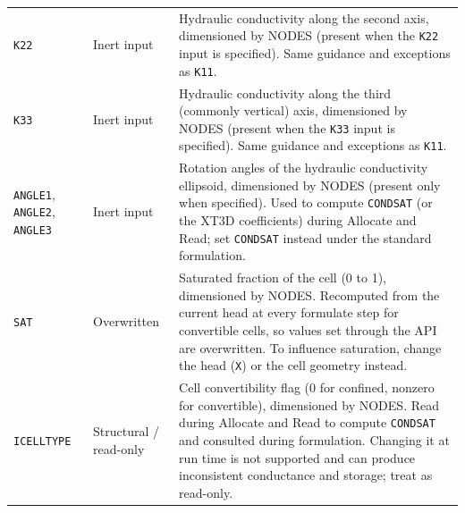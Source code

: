 \begin{longtable}{p{} p{} p{}}
\texttt{K22} & Inert input &
Hydraulic conductivity along the second axis, dimensioned by NODES (present when
the \texttt{K22} input is specified). Same guidance and exceptions as
\texttt{K11}. \\

\texttt{K33} & Inert input &
Hydraulic conductivity along the third (commonly vertical) axis, dimensioned by
NODES (present when the \texttt{K33} input is specified). Same guidance and
exceptions as \texttt{K11}. \\

\texttt{ANGLE1}, \texttt{ANGLE2}, \texttt{ANGLE3} & Inert input &
Rotation angles of the hydraulic conductivity ellipsoid, dimensioned by NODES
(present only when specified). Used to compute \texttt{CONDSAT} (or the XT3D
coefficients) during Allocate and Read; set \texttt{CONDSAT} instead under the
standard formulation. \\

\texttt{SAT} & Overwritten &
Saturated fraction of the cell (0 to 1), dimensioned by NODES. Recomputed from
the current head at every formulate step for convertible cells, so values set
through the API are overwritten. To influence saturation, change the head
(\texttt{X}) or the cell geometry instead. \\

\texttt{ICELLTYPE} & Structural / read-only &
Cell convertibility flag (0 for confined, nonzero for convertible), dimensioned
by NODES. Read during Allocate and Read to compute \texttt{CONDSAT} and consulted
during formulation. Changing it at run time is not supported and can produce
inconsistent conductance and storage; treat as read-only. \\

\hline
\end{longtable}
